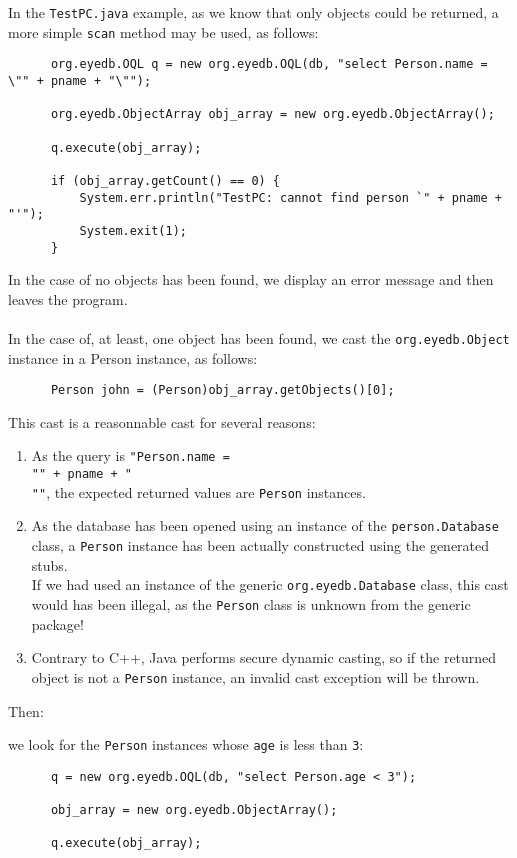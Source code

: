 In the \texttt{TestPC.java} example, as we know that only objects could
be returned, a more simple \texttt{scan} method may be used, as follows:
{\verbsize \begin{verbatim}
      org.eyedb.OQL q = new org.eyedb.OQL(db, "select Person.name = \"" + pname + "\"");

      org.eyedb.ObjectArray obj_array = new org.eyedb.ObjectArray();

      q.execute(obj_array);

      if (obj_array.getCount() == 0) {
          System.err.println("TestPC: cannot find person `" + pname + "'");
          System.exit(1);
      }
\end{verbatim}
}
In the case of no objects has been found, we display an error message and
then leaves the program.
\\
\\
In the case of, at least, one object has been found, we cast the \texttt{org.eyedb.Object} instance in a Person instance, as follows:
{\verbsize \begin{verbatim}
      Person john = (Person)obj_array.getObjects()[0];
\end{verbatim}
}
This cast is a reasonnable cast for several reasons:
\begin{enumerate}
\item As the query is \texttt{"Person.name = \\"" + pname + "\\""}, the expected
returned values are \texttt{Person} instances.
\item As the database has been opened using an instance
of the \texttt{person.Database} class, a \texttt{Person} instance has been
actually constructed using the generated stubs.
\\
If we had used an instance of the generic \texttt{org.eyedb.Database} class, this
cast would has been illegal, as the \texttt{Person} class is unknown from
the generic \eyedb package!
\item Contrary to C++, Java performs secure dynamic casting, so if the
returned object is not a \texttt{Person} instance, an invalid cast exception
will be thrown.
\end{enumerate}
Then:
\bi
\item we look for the \texttt{Person} instances whose \texttt{age} is less
than \texttt{3}:
{\verbsize \begin{verbatim}
      q = new org.eyedb.OQL(db, "select Person.age < 3");

      obj_array = new org.eyedb.ObjectArray();

      q.execute(obj_array);
\end{verbatim}
}
